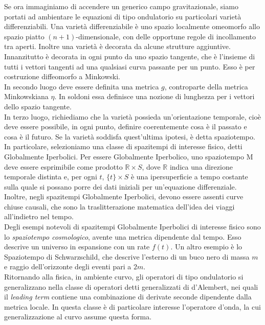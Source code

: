 \documentclass[11pt,a4paper]{article}
\theoremstyle{classicthm}
\theoremstyle{classicthm}
\theoremstyle{definition}
\def\mR{{\mathbb R}}
\begin{document}
Se ora immaginiamo di accendere un generico campo gravitazionale, siamo portati ad ambientare le equazioni di tipo ondulatorio su particolari varietà differenziabili.
Una varietà differenziabile è uno spazio localmente omeomorfo allo spazio piatto $(n+1)$-dimensionale, con delle opportune regole di incollamento tra aperti. Inoltre una varietà è decorata da alcune strutture aggiuntive.\\
Innanzitutto è decorata in ogni punto da uno spazio tangente, che è l'insieme di tutti i vettori tangenti ad una qualsiasi curva passante per un punto. Esso è per costruzione diffeomorfo a Minkowski.\\
In secondo luogo deve essere definita una metrica $g$, controparte della metrica Minkowskiana $\eta$. In soldoni essa definisce una nozione di lunghezza per i vettori dello spazio tangente.\\
In terzo luogo, richiediamo che la varietà possieda un'orientazione temporale, cioè deve essere possibile, in ogni punto, definire coerentemente cosa è il passato e cosa è il futuro. Se la varietà soddisfa quest'ultima ipotesi, è detta spaziotempo.\\

In particolare, selezioniamo una classe di spazitempi di interesse fisico, detti Globalmente Iperbolici. Per essere Globalmente Iperbolico, uno spaziotempo $\mathrm{M}$ deve essere esprimibile come prodotto $\mR\times S$, dove $\mR$ indica una direzione temporale distinta e, per ogni $t$, $\{t\}\times S$ è una ipersuperficie a tempo costante sulla quale si possano porre dei dati iniziali per un'equazione differenziale. Inoltre, negli spazitempi Globalmente Iperbolici, devono essere assenti curve chiuse causali, che sono la traslitterazione matematica dell'idea dei viaggi all'indietro nel tempo.\\

Degli esempi notevoli di spazitempi Globalmente Iperbolici di interesse fisico sono lo \emph{spaziotempo cosmologico}, avente una metrica dipendente dal tempo. Esso descrive un universo in espansione con un rate $f(t)$. Un altro esempio è lo Spaziotempo di Schwarzschild, che descrive l'esterno di un buco nero di massa $m$ e raggio dell'orizzonte degli eventi pari a $2m$.\\

Ritornando alla fisica, in ambiente curvo, gli operatori di tipo ondulatorio si generalizzano nella classe di operatori detti generalizzati di d'Alembert, nei quali il \emph{leading term} contiene una combinazione di derivate seconde dipendente dalla metrica locale. In questa classe è di particolare interesse l'operatore d'onda, la cui generalizzazione al curvo assume questa forma.\\
\end{document}
